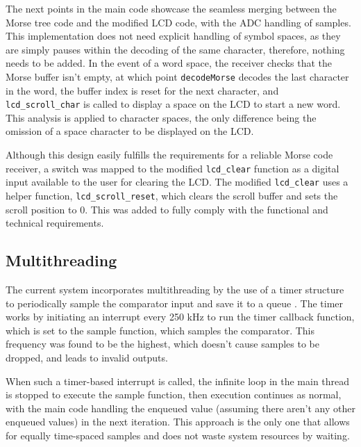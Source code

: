 \documentclass[head=13.6pt]{cce2014-design}
\begin{document}
The next points in the main code showcase the seamless merging between the Morse tree code and the modified LCD code, with the ADC handling of samples. This implementation does not need explicit handling of symbol spaces, as they are simply pauses within the decoding of the same character, therefore, nothing needs to be added. In the event of a word space, the receiver checks that the Morse buffer isn’t empty, at which point \texttt{decodeMorse} decodes the last character in the word, the buffer index is reset for the next character, and \texttt{lcd\_scroll\_char} is called to display a space on the LCD to start a new word.
This analysis is applied to character spaces, the only difference being the omission of a space character to be displayed on the LCD.

Although this design easily fulfills the requirements for a reliable Morse code receiver, a switch was mapped to the modified \texttt{lcd\_clear} function as a digital input available to the user for clearing the LCD. The modified \texttt{lcd\_clear} uses a helper function, \texttt{lcd\_scroll\_reset}, which clears the scroll buffer and sets the scroll position to 0. This was added to fully comply with the functional and technical requirements.

\subsection{Multithreading}
The current system incorporates multithreading by the use of a timer structure to periodically sample the comparator input and save it to a queue \cite{umcode}. The timer works by initiating an interrupt every 250 kHz to run the timer callback function, which is set to the sample function, which samples the comparator. This frequency was found to be the highest, which doesn't cause samples to be dropped, and leads to invalid outputs.

When such a timer-based interrupt is called, the infinite loop in the main thread is stopped to execute the sample function, then execution continues as normal, with the main code handling the enqueued value (assuming there aren’t any other enqueued values) in the next iteration. This approach is the only one that allows for equally time-spaced samples and does not waste system resources by waiting.
\end{document}
